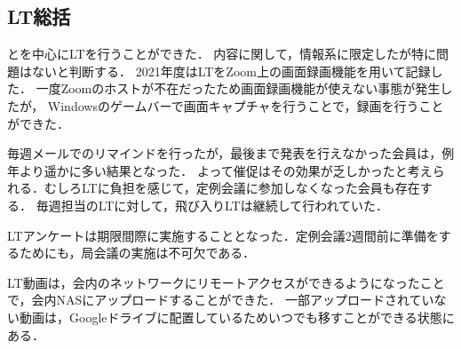 \subsection*{LT総括}


\firstGrade{}と\secondGrade{}を中心にLTを行うことができた．
内容に関して，情報系に限定したが特に問題はないと判断する．
2021年度はLTをZoom上の画面録画機能を用いて記録した．
一度Zoomのホストが不在だったため画面録画機能が使えない事態が発生したが，
Windowsのゲームバーで画面キャプチャを行うことで，録画を行うことができた．

毎週メールでのリマインドを行ったが，最後まで発表を行えなかった会員は，例年より遥かに多い結果となった．
よって催促はその効果が乏しかったと考えられる．むしろLTに負担を感じて，定例会議に参加しなくなった会員も存在する．
毎週担当のLTに対して，飛び入りLTは継続して行われていた．

LTアンケートは期限間際に実施することとなった．定例会議2週間前に準備をするためにも，局会議の実施は不可欠である．

LT動画は，会内のネットワークにリモートアクセスができるようになったことで，会内NASにアップロードすることができた．
一部アップロードされていない動画は，Googleドライブに配置しているためいつでも移すことができる状態にある．
